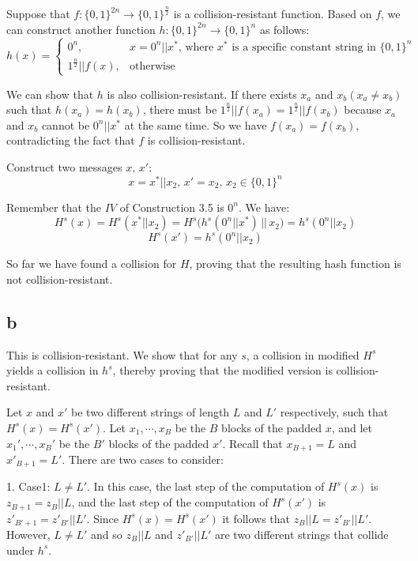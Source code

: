 \documentclass[a4papers]{ctexart}
\begin{document}
Suppose that $f:\{0,1\}^{2n}\rightarrow\{0,1\}^{\frac{n}{2}}$ is a collision-resistant function.
 Based on $f$, we can construct another function $h:\{0,1\}^{2n}\rightarrow\{0,1\}^{n}$ as follows:
 \begin{equation*}
h(x)=
 \begin{cases}
     0^n, & x = 0^n || x^*,\,\mbox{where }x^*\mbox{ is a specific constant string in }\{0,1\}^{n} \\
     1^{\frac{n}{2}}||f(x), & \mbox{otherwise}
 \end{cases}
\end{equation*}

We can show that $h$ is also collision-resistant. If there exists $x_a$ and $x_b(x_a\ne x_b)$ such that $h(x_a)=h(x_b)$, 
there must be $1^{\frac{n}{2}}||f(x_a) =1^{\frac{n}{2}}||f(x_b)$ because $x_a$ and $x_b$ cannot be $0^n || x^*$ at the same time.
So we have $f(x_a)=f(x_b)$, contradicting the fact that $f$ is collision-resistant.

Construct two messages $x,\, x'$:
\[x=x^*||x_2,\, x'=x_2,\, x_2 \in \{0,1\}^{n}\]

Remember that the $IV$ of Construction 3.5 is $0^n$. We have:
\[H^s(x) = H^s(x^*||x_2) =  H^s\Big(h^s(0^n||x^*)\, ||\, x_2\Big) =  h^s(0^n||x_2) \]
\[H^s(x') = h^s(0^n||x_2)\]

So far we have found a collision for $H$, proving that the resulting hash function is 
not collision-resistant.


\subsection*{b}
This is collision-resistant.
We show that for any $s$, a collision in modified $H^s$ yields a collision in $h^s$, 
thereby proving that the modified version is collision-resistant.

Let $x$ and $x'$ be two different strings of length $L$ and $L'$ respectively, such that
$H^s(x)=H^s(x')$. Let $x_1,\cdots,x_B$ be the $B$ blocks of the padded $x$, and let $x_1',\cdots,x_B'$ 
be the $B'$ blocks of the padded $x'$. Recall that $x_{B+1}=L$ and $x'_{B+1}=L'$. 
There are two cases to consider:

1. Case1: $L\ne L'$. In this case, the last step of the computation of $H^s(x)$ is $z_{B+1}=z_{B}||L$, and
the last step of the computation of $H^s(x')$ is $z'_{B'+1}=z'_{B'}||L'$. Since $H^s(x)=H^s(x')$ it follows that 
$z_{B}||L = z'_{B'}||L'$. However, $L \ne L'$ and so $z_{B}||L$ and $z'_{B'}||L'$ are two different strings that collide under $h^s$.
\end{document}
